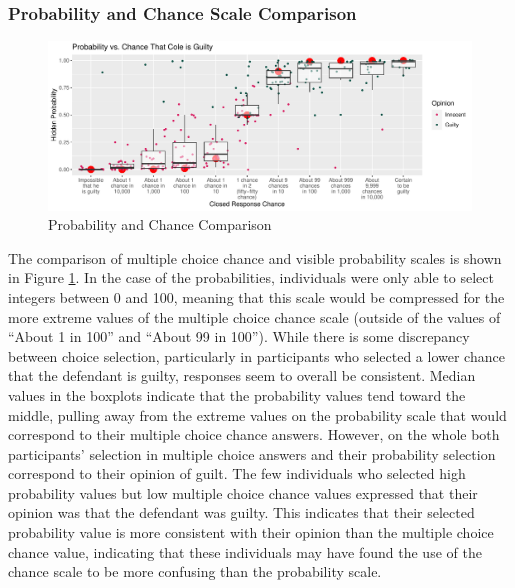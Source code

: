 \documentclass[print]{nuthesis}
\begin{document}
\hypertarget{probability-and-chance-scale-comparison}{%
\subsubsection{Probability and Chance Scale Comparison}\label{probability-and-chance-scale-comparison}}

\begin{figure}

{\centering \includegraphics[width=\linewidth]{thesis_files/figure-latex/likeprob-1} 

}

\caption{Probability and Chance Comparison}\label{fig:likeprob}
\end{figure}

The comparison of multiple choice chance and visible probability scales is shown in Figure \ref{fig:likeprob}.
In the case of the probabilities, individuals were only able to select integers between 0 and 100, meaning that this scale would be compressed for the more extreme values of the multiple choice chance scale (outside of the values of ``About 1 in 100'' and ``About 99 in 100'').
While there is some discrepancy between choice selection, particularly in participants who selected a lower chance that the defendant is guilty, responses seem to overall be consistent.
Median values in the boxplots indicate that the probability values tend toward the middle, pulling away from the extreme values on the probability scale that would correspond to their multiple choice chance answers.
However, on the whole both participants' selection in multiple choice answers and their probability selection correspond to their opinion of guilt.
The few individuals who selected high probability values but low multiple choice chance values expressed that their opinion was that the defendant was guilty.
This indicates that their selected probability value is more consistent with their opinion than the multiple choice chance value, indicating that these individuals may have found the use of the chance scale to be more confusing than the probability scale.
\end{document}
